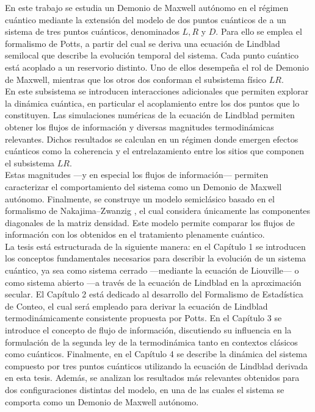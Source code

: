 En este trabajo se estudia un Demonio de Maxwell autónomo en el régimen cuántico mediante la extensión del modelo de dos puntos cuánticos de \cite{horowitz2014thermodynamics} a un sistema de tres puntos cuánticos, denominados $L,R$ y $D$. Para ello se emplea el formalismo de Potts, a partir del cual se deriva una ecuación de Lindblad semilocal que describe la evolución temporal del sistema. Cada punto cuántico está acoplado a un reservorio distinto. Uno de ellos desempeña el rol de Demonio de Maxwell, mientras que los otros dos conforman el subsistema físico $LR$. \\

En este subsistema se introducen interacciones adicionales que permiten explorar la dinámica cuántica, en particular el acoplamiento entre los dos puntos que lo constituyen. Las simulaciones numéricas de la ecuación de Lindblad permiten obtener los flujos de información y diversas magnitudes termodinámicas relevantes. Dichos resultados se calculan en un régimen donde emergen efectos cuánticos como la coherencia y el entrelazamiento entre los sitios que componen el subsistema $LR$. \\ 

Estas magnitudes ---y en especial los flujos de información--- permiten caracterizar el comportamiento del sistema como un Demonio de Maxwell autónomo. 
Finalmente, se construye un modelo semiclásico basado en el formalismo de Nakajima--Zwanzig \cite{zwanzig1966statistical}, el cual considera únicamente las componentes diagonales de la matriz densidad. Este modelo permite comparar los flujos de información con los obtenidos en el tratamiento plenamente cuántico. \\


La tesis está estructurada de la siguiente manera: en el Capítulo 1 se introducen los conceptos fundamentales necesarios para describir la evolución de un sistema cuántico, ya sea como sistema cerrado —mediante la ecuación de Liouville— o como sistema abierto —a través de la ecuación de Lindblad en la aproximación secular. El Capítulo 2 está dedicado al desarrollo del Formalismo de Estadística de Conteo, el cual será empleado para derivar la ecuación de Lindblad termodinámicamente consistente propuesta por Potts. En el Capítulo 3 se introduce el concepto de flujo de información, discutiendo su influencia en la formulación de la segunda ley de la termodinámica tanto en contextos clásicos como cuánticos. Finalmente, en el Capítulo 4 se describe la dinámica del sistema compuesto por tres puntos cuánticos utilizando la ecuación de Lindblad derivada en esta tesis. Además, se analizan los resultados más relevantes obtenidos para dos configuraciones distintas del modelo, en una de las cuales el sistema se comporta como un Demonio de Maxwell autónomo.





